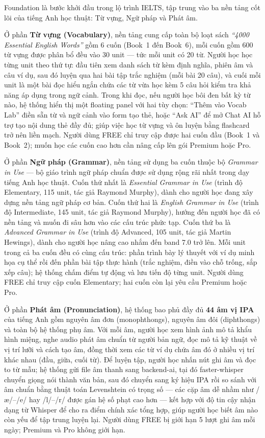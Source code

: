 Foundation là bước khởi đầu trong lộ trình IELTS, tập trung vào ba nền tảng cốt lõi của tiếng Anh học thuật: Từ vựng, Ngữ pháp và Phát âm.

Ở phần \textbf{Từ vựng (Vocabulary)}, nền tảng cung cấp toàn bộ loạt sách \textit{``4000 Essential English Words''} gồm 6 cuốn (Book~1 đến Book~6), mỗi cuốn gồm 600 từ vựng được phân bổ đều vào 30 unit --- tức mỗi unit có 20 từ. Người học học từng unit theo thứ tự: đầu tiên xem danh sách từ kèm định nghĩa, phiên âm và câu ví dụ, sau đó luyện qua hai bài tập trắc nghiệm (mỗi bài 20 câu), và cuối mỗi unit là một bài đọc hiểu ngắn chứa các từ vừa học kèm 5 câu hỏi kiểm tra khả năng áp dụng trong ngữ cảnh. Trong khi đọc, nếu người học bôi đen bất kỳ từ nào, hệ thống hiển thị một floating panel với hai tùy chọn: ``Thêm vào Vocab Lab'' điền sẵn từ và ngữ cảnh vào form tạo thẻ, hoặc ``Ask AI'' để mở Chat AI hỗ trợ tạo nội dung thẻ đầy đủ; giúp việc học từ vựng và ôn luyện bằng flashcard trở nên liền mạch. Người dùng FREE chỉ truy cập được hai cuốn đầu (Book~1 và Book~2); muốn học các cuốn cao hơn cần nâng cấp lên gói Premium hoặc Pro.

Ở phần \textbf{Ngữ pháp (Grammar)}, nền tảng sử dụng ba cuốn thuộc bộ \textit{Grammar in Use} --- bộ giáo trình ngữ pháp chuẩn được sử dụng rộng rãi nhất trong dạy tiếng Anh học thuật. Cuốn thứ nhất là \textit{Essential Grammar in Use} (trình độ Elementary, 115 unit, tác giả Raymond Murphy), dành cho người học đang xây dựng nền tảng ngữ pháp cơ bản. Cuốn thứ hai là \textit{English Grammar in Use} (trình độ Intermediate, 145 unit, tác giả Raymond Murphy), hướng đến người học đã có nền tảng và muốn đi sâu hơn vào các cấu trúc phức tạp. Cuốn thứ ba là \textit{Advanced Grammar in Use} (trình độ Advanced, 105 unit, tác giả Martin Hewings), dành cho người học nâng cao nhắm đến band 7.0 trở lên. Mỗi unit trong cả ba cuốn đều có cùng cấu trúc: phần trình bày lý thuyết với ví dụ minh họa cụ thể rồi đến phần bài tập thực hành (trắc nghiệm, điền vào chỗ trống, sắp xếp câu); hệ thống chấm điểm tự động và lưu tiến độ từng unit. Người dùng FREE chỉ truy cập cuốn Elementary; hai cuốn còn lại yêu cầu Premium hoặc Pro.

Ở phần \textbf{Phát âm (Pronunciation)}, hệ thống bao phủ đầy đủ \textbf{44 âm vị IPA} của tiếng Anh gồm nguyên âm đơn (monophthongs), nguyên âm đôi (diphthongs) và toàn bộ hệ thống phụ âm. Với mỗi âm, người học xem hình ảnh mô tả khẩu hình miệng, nghe audio phát âm chuẩn từ người bản ngữ, đọc mô tả kỹ thuật về vị trí lưỡi và cách tạo âm, đồng thời xem các từ ví dụ chứa âm đó ở nhiều vị trí khác nhau (đầu, giữa, cuối từ). Để luyện tập, người học nhấn nút ghi âm và đọc to từ mẫu; hệ thống gửi file âm thanh sang backend-ai, tại đó faster-whisper chuyển giọng nói thành văn bản, sau đó chuyển sang ký hiệu IPA rồi so sánh với âm chuẩn bằng thuật toán Levenshtein có trọng số --- các cặp âm dễ nhầm như /æ/--/e/ hay /l/--/r/ được gán hệ số phạt cao hơn --- kết hợp với độ tin cậy nhận dạng từ Whisper để cho ra điểm chính xác tổng hợp, giúp người học biết âm nào còn yếu để tập trung luyện lại. Người dùng FREE bị giới hạn 5 lượt ghi âm mỗi ngày; Premium và Pro không giới hạn.

